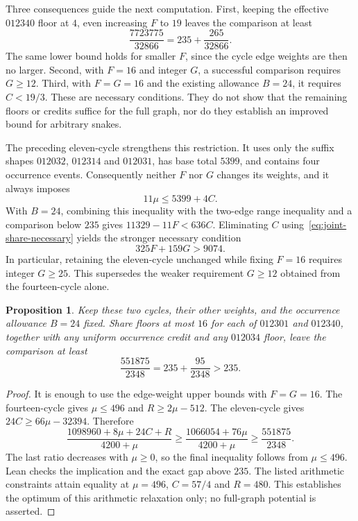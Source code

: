 \documentclass[11pt,a4paper]{article}
\newtheorem{proposition}[theorem]{Proposition}
\theoremstyle{definition}
\theoremstyle{remark}
\begin{document}
Three consequences guide the next computation. First, keeping the effective
$012340$ floor at $4$, even increasing $F$ to $19$ leaves the comparison at least
\[
\frac{7723775}{32866}=235+\frac{265}{32866}.
\]
The same lower bound holds for smaller $F$, since the cycle edge weights
are then no larger. Second, with $F=16$ and integer $G$, a successful
comparison requires $G\ge12$. Third, with $F=G=16$ and the existing
allowance $B=24$, it requires $C<19/3$. These are necessary conditions.
They do not show that the remaining floors or credits suffice for the
full graph, nor do they establish an improved bound for arbitrary snakes.

The preceding eleven-cycle strengthens this restriction. It uses only the
suffix shapes $012032$, $012314$ and $012031$, has base total $5399$,
and contains four occurrence events. Consequently neither $F$ nor $G$
changes its weights, and it always imposes
\[
11\mu\le5399+4C.
\]
With $B=24$, combining this inequality with the two-edge range inequality
and a comparison below $235$ gives $11329-11F<636C$. Eliminating $C$
using~\eqref{eq:joint-share-necessary} yields the stronger necessary condition
\begin{equation}\label{eq:two-cycle-share-necessary}
325F+159G>9074.
\end{equation}
In particular, retaining the eleven-cycle unchanged while fixing $F=16$
requires integer $G\ge25$. This supersedes the weaker requirement $G\ge12$
obtained from the fourteen-cycle alone.

\begin{proposition}\label{prop:two-cycle-share16-obstruction}
Keep these two cycles, their other weights, and the occurrence allowance
$B=24$ fixed. Share floors at most $16$ for each of $012301$ and $012340$,
together with any uniform occurrence credit and any $012034$ floor,
leave the comparison at least
\[
\frac{551875}{2348}=235+\frac{95}{2348}>235.
\]
\end{proposition}
\begin{proof}
It is enough to use the edge-weight upper bounds with $F=G=16$.
The fourteen-cycle gives $\mu\le496$ and $R\ge2\mu-512$.
The eleven-cycle gives $24C\ge66\mu-32394$. Therefore
\[
\frac{1098960+8\mu+24C+R}{4200+\mu}
\ge\frac{1066054+76\mu}{4200+\mu}
\ge\frac{551875}{2348}.
\]
The last ratio decreases with $\mu\ge0$, so the final inequality follows
from $\mu\le496$. Lean checks the implication and the exact gap above $235$.
The listed arithmetic constraints attain equality at
$\mu=496$, $C=57/4$ and $R=480$. This establishes the optimum of this
arithmetic relaxation only; no full-graph potential is asserted.
\end{proof}
\end{document}
